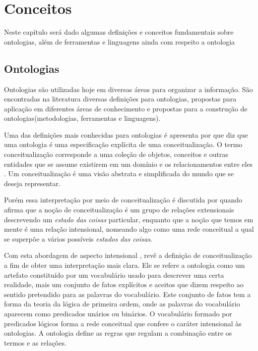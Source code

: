 \chapter{Conceitos}
\label{cap:conceitos}

Neste capítulo será dado algumas definições e conceitos fundamentais sobre 
ontologias, além de ferramentas e linguagens ainda com respeito a ontologia

\section{Ontologias}
\label{sec:definicao}

Ontologias são utilizadas hoje em diversas áreas para organizar a informação. 
São encontradas na literatura diversas definições para ontologias, propostas 
para aplicação em diferentes áreas de conhecimento e propostas para a construção 
de ontologias(metodologias, ferramentas e linguagens).

Uma das definições mais conhecidas para ontologias é apresenta por 
\cite{gruber1995toward} que diz que uma ontologia é uma especificação explícita 
de uma conceitualização. O termo conceitualização corresponde a uma coleção de 
objetos, conceitos e outras entidades que se assume existirem em um domínio e 
os relacionamentos entre eles \cite{genesereth1987logical}. Um conceitualização 
é uma visão abstrata e simplificada do mundo que se deseja representar.

Porém essa interpretação por meio de conceitualização é discutida por 
\cite{giaretta1995ontologies} quando afirma que a noção de conceitualização é um 
grupo de relações extensionais descrevendo um {\it estado das coisas} particular, 
enquanto que a noção que temos em mente é uma relação intensional, nomeando algo 
como uma rede conceitual a qual se superpõe a vários possíveis 
{\it estados das coisas}.

Com esta abordagem de aspecto intensional \cite{guarino1998formal}, revê a 
definição de conceitualização a fim de obter uma interpretação mais clara. Ele 
se refere a ontologia como um artefato constituído por um vocabulário usado para 
descrever uma certa realidade, mais um conjunto de fatos explícitos e aceitos 
que dizem respeito ao sentido pretendido para as palavras do vocabulário. Este 
conjunto de fatos tem a forma da teoria da lógica de primeira ordem, onde as 
palavras do vocabulário aparecem como predicados unários ou binários. O 
vocabulário formado por predicados lógicos forma a rede conceitual que confere 
o caráter intensional às ontologias. A ontologia define as regras que regulam a 
combinação entre os termos e as relações.

